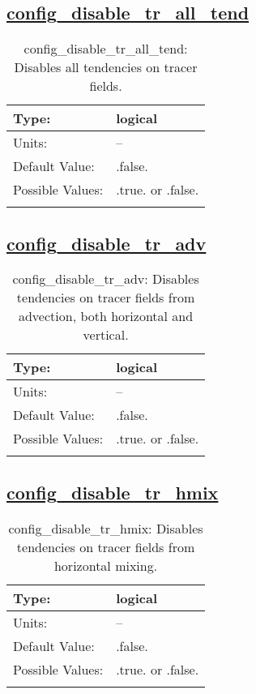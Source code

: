 \subsection[config\_disable\_tr\_all\_tend]{\hyperref[sec:nm_tab_debug]{config\_disable\_tr\_all\_tend}}
\label{subsec:nm_sec_config_disable_tr_all_tend}
\begin{center}
\begin{longtable}{| p{2.0in} || p{4.0in} |}
    \hline
    Type: & logical \\
    \hline
    Units: & -- \\
    \hline
    Default Value: & .false. \\
    \hline
    Possible Values: & .true. or .false. \\
    \hline
    \caption{config\_disable\_tr\_all\_tend: Disables all tendencies on tracer fields.}
\end{longtable}
\end{center}
\subsection[config\_disable\_tr\_adv]{\hyperref[sec:nm_tab_debug]{config\_disable\_tr\_adv}}
\label{subsec:nm_sec_config_disable_tr_adv}
\begin{center}
\begin{longtable}{| p{2.0in} || p{4.0in} |}
    \hline
    Type: & logical \\
    \hline
    Units: & -- \\
    \hline
    Default Value: & .false. \\
    \hline
    Possible Values: & .true. or .false. \\
    \hline
    \caption{config\_disable\_tr\_adv: Disables tendencies on tracer fields from advection, both horizontal and vertical.}
\end{longtable}
\end{center}
\subsection[config\_disable\_tr\_hmix]{\hyperref[sec:nm_tab_debug]{config\_disable\_tr\_hmix}}
\label{subsec:nm_sec_config_disable_tr_hmix}
\begin{center}
\begin{longtable}{| p{2.0in} || p{4.0in} |}
    \hline
    Type: & logical \\
    \hline
    Units: & -- \\
    \hline
    Default Value: & .false. \\
    \hline
    Possible Values: & .true. or .false. \\
    \hline
    \caption{config\_disable\_tr\_hmix: Disables tendencies on tracer fields from horizontal mixing.}
\end{longtable}
\end{center}
